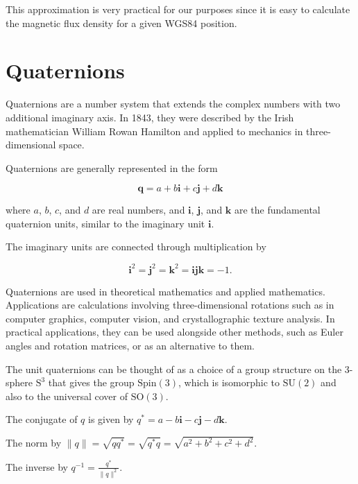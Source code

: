 This approximation is very practical for our purposes since it is easy to calculate the magnetic flux density for a given WGS84 position.

\section{Quaternions}

Quaternions are a number system that extends the complex numbers with two additional imaginary axis. In 1843, they were described by the Irish mathematician William Rowan Hamilton and applied to mechanics in three-dimensional space.\cite{quaternions}

Quaternions are generally represented in the form

\begin{equation}
\label{eq:quaternion}
    \bm{q} = a + b \bm{i} + c \bm{j} + d \bm{k}
\end{equation}

where $a$, $b$, $c$, and $d$ are real numbers, and $\bm{i}$, $\bm{j}$, and $\bm{k}$ are the fundamental quaternion units, similar to the imaginary unit $\bm{i}$.

The imaginary units are connected through multiplication by

\begin{equation}
\label{eq:quaternion_units}
    \bm{i}^2 = \bm{j}^2 = \bm{k}^2 = \bm{ijk} = -1 \textrm{.}
\end{equation}

Quaternions are used in theoretical mathematics and applied mathematics. Applications are calculations involving three-dimensional rotations such as in computer graphics, computer vision, and crystallographic texture analysis. In practical applications, they can be used alongside other methods, such as Euler angles and rotation matrices, or as an alternative to them.

The unit quaternions can be thought of as a choice of a group structure on the 3-sphere $\text{S}^3$ that gives the group $\text{Spin}(3)$, which is isomorphic to $\text{SU}(2)$ and also to the universal cover of $\text{SO}(3)$.

The conjugate of $q$ is given by $q^* = a - b \bm{i} - c \bm{j} - d \bm{k}$.

The norm by $\lVert q\rVert = \sqrt{qq^*} = \sqrt{q^{*}q} = \sqrt{a^2 + b^2 + c^2 + d^2}$.

The inverse by $q^{-1} = \frac{q^*}{\lVert q\rVert ^2}$.


